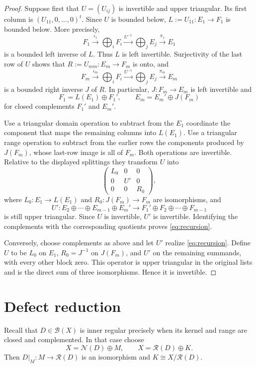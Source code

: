 \documentclass[11pt]{article}
\newcommand{\B}{\mathcal B}
\newcommand{\N}{\mathcal N}
\newcommand{\R}{\mathcal R}
\begin{document}
\begin{proof}
Suppose first that $U=(U_{ij})$ is invertible and upper triangular.  Its first
column is $(U_{11},0,\ldots,0)^t$.  Since $U$ is bounded below,
$L:=U_{11}:E_1\to F_1$ is bounded below.  More precisely,
\[
 F_1\xrightarrow{\iota_1}\bigoplus_iF_i
 \xrightarrow{U^{-1}}\bigoplus_jE_j
 \xrightarrow{\pi_1}E_1
\]
is a bounded left inverse of $L$.  Thus $L$ is left invertible.  Surjectivity
of the last row of $U$ shows that $R:=U_{mm}:E_m\to F_m$ is onto, and
\[
 F_m\xrightarrow{\iota_m}\bigoplus_iF_i
 \xrightarrow{U^{-1}}\bigoplus_jE_j
 \xrightarrow{\pi_m}E_m
\]
is a bounded right inverse $J$ of $R$.  In particular, $J:F_m\to E_m$ is
left invertible and
\[
 F_1=L(E_1)\oplus F_1',\qquad
 E_m=E_m'\oplus J(F_m)
\]
for closed complements $F_1'$ and $E_m'$.

Use a triangular domain operation to subtract from the $E_1$ coordinate the
component that maps the remaining columns into $L(E_1)$.  Use a triangular
range operation to subtract from the earlier rows the components produced by
$J(F_m)$, whose last-row image is all of $F_m$.  Both operations are
invertible.  Relative to the displayed splittings they transform $U$ into
\[
 \begin{pmatrix}
 L_0&0&0\\
 0&U'&0\\
 0&0&R_0
 \end{pmatrix},
\]
where $L_0:E_1\to L(E_1)$ and $R_0:J(F_m)\to F_m$ are isomorphisms, and
\[
 U':E_2\oplus\cdots\oplus E_{m-1}\oplus E_m'
 \longrightarrow F_1'\oplus F_2\oplus\cdots\oplus F_{m-1}
\]
is still upper triangular.  Since $U$ is invertible, $U'$ is invertible.
Identifying the complements with the corresponding quotients proves
\eqref{eq:recursion}.

Conversely, choose complements as above and let $U'$ realize
\eqref{eq:recursion}.  Define $U$ to be $L_0$ on $E_1$, $R_0=J^{-1}$ on
$J(F_m)$, and $U'$ on the remaining summands, with every other block zero.
This operator is upper triangular in the original lists and is the direct sum
of three isomorphisms.  Hence it is invertible.
\end{proof}

\section{Defect reduction}

Recall that $D\in\B(X)$ is inner regular precisely when its kernel and range
are closed and complemented.  In that case choose
\[
 X=\N(D)\oplus M,\qquad X=\R(D)\oplus K.
\]
Then $D|_M:M\to\R(D)$ is an isomorphism and
$K\cong X/\R(D)$.
\end{document}
